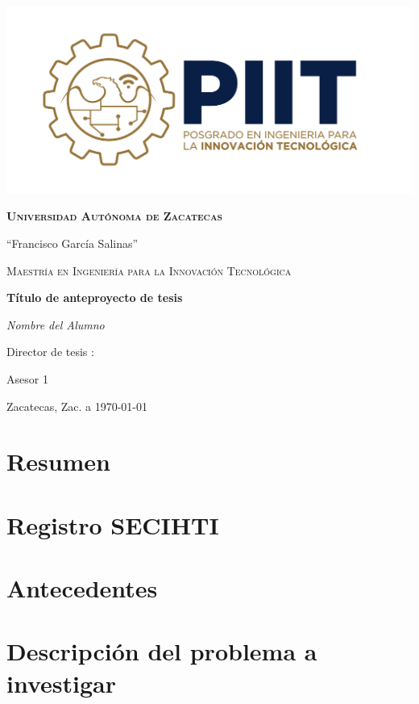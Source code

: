 \documentclass[10pt,letterpaper]{report}
\begin{document}
	\begin{titlepage}
		\centering
		\includegraphics[width=.7\textwidth]{Imagenes/Logo}\par\vspace{1cm}
		{\scshape\LARGE \bfseries Universidad Autónoma de Zacatecas \par 
        ``Francisco García Salinas''\par }
		\vspace{1cm}
        {\scshape\Large Maestría en Ingeniería para la Innovación Tecnológica\par}
		\vspace{1.5cm}
		{\huge\bfseries Título de anteproyecto de tesis\par}
		\vspace{2cm}
		{\Large\itshape Nombre del Alumno\par}
		\vfill
		Director de tesis :\par
		Asesor 1\par
				
		\vfill
		
		{\large Zacatecas, Zac. a \today\par}
	\end{titlepage}

\chapter*{Resumen}
          

\tableofcontents
\chapter{Registro SECIHTI}

\chapter{Antecedentes}

\chapter{Descripción del problema a investigar}

\end{document}
